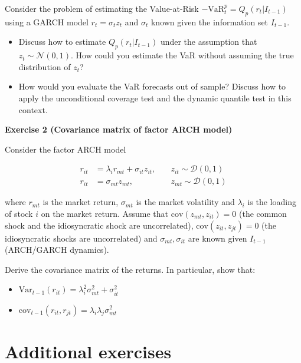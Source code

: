 \documentclass[
]{book}
\providecommand{\tightlist}{%
  \setlength{\itemsep}{0pt}\setlength{\parskip}{0pt}}
\begin{document}
Consider the problem of estimating the Value-at-Risk \(-\text{VaR}_t^p = Q_p(r_t | I_{t-1})\) using a GARCH model \(r_t = \sigma_t z_t\) and \(\sigma_t\) known given the information set \(I_{t-1}\).

\begin{itemize}
\item
  Discuss how to estimate \(Q_p(r_t | I_{t-1})\) under the assumption that \(z_t \sim \mathcal{N}(0,1)\). How could you estimate the VaR without assuming the true distribution of \(z_t\)?
\item
  How would you evaluate the VaR forecasts out of sample? Discuss how to apply the unconditional coverage test and the dynamic quantile test in this context.
\end{itemize}

\textbf{Exercise 2 (Covariance matrix of factor ARCH model)}

Consider the factor ARCH model

\[
\begin{aligned}
r_{it} &= \lambda_i r_{mt} + \sigma_{it} z_{it}, &\quad z_{it} \sim \mathcal{D}(0,1) \\
r_{it} &= \sigma_{mt} z_{mt}, &\quad z_{mt} \sim \mathcal{D}(0,1) 
\end{aligned}
\]

where \(r_{mt}\) is the market return, \(\sigma_{mt}\) is the market volatility and \(\lambda_i\) is the loading of stock \(i\) on the market return. Assume that \(\text{cov}(z_{mt}, z_{it}) = 0\) (the common shock and the idiosyncratic shock are uncorrelated), \(\text{cov}(z_{it}, z_{jt}) = 0\) (the idiosyncratic shocks are uncorrelated) and \(\sigma_{mt}, \sigma_{it}\) are known given \(I_{t-1}\) (ARCH/GARCH dynamics).

Derive the covariance matrix of the returns. In particular, show that:

\begin{itemize}
\tightlist
\item
  \(\text{Var}_{t-1}(r_{it}) = \lambda_i^2 \sigma^2_{mt} + \sigma_{it}^2\)
\item
  \(\text{cov}_{t-1}(r_{it}, r_{jt}) = \lambda_i \lambda_j \sigma_{mt}^2\)
\end{itemize}

\hypertarget{session09}{%
\chapter{Additional exercises}\label{session09}}
\end{document}
